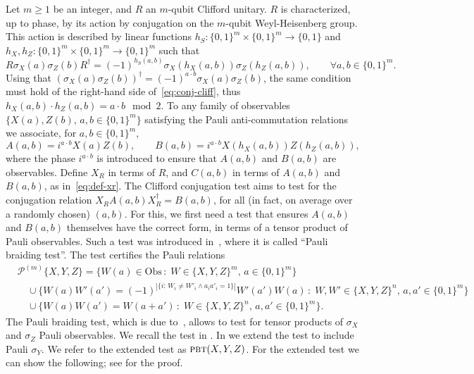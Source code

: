 \documentclass{toc}
\newcommand{\setft}[1]{\mathrm{#1}}
\newcommand{\Obs}{\setft{Obs}}
\newcommand{\pbt}{\textsc{pbt}}
\newcommand{\paulin}{\mathcal{P}^{(m)}\!}
\begin{document}
Let $m\geq 1$ be an integer, and $R$ an $m$-qubit Clifford unitary. $R$ is characterized, up to phase, by its action by conjugation on the $m$-qubit Weyl-Heisenberg group. This action is described  by linear functions $h_S:\{0,1\}^m\times\{0,1\}^m \to \{0,1\}$ and $h_X,h_Z:\{0,1\}^m\times\{0,1\}^m \to \{0,1\}^m$ such that
\begin{equation}\label{eq:conj-cliff}
R \sigma_X(a)\sigma_Z(b) R^\dagger = (-1)^{h_S(a,b)}\sigma_X(h_X(a,b))\sigma_Z(h_Z(a,b)),\qquad\forall a,b\in\{0,1\}^m.
\end{equation}
Using that $(\sigma_X(a)\sigma_Z(b))^\dagger = (-1)^{a\cdot b} \sigma_X(a)\sigma_Z(b)$, the same condition must hold of the right-hand side of~\eqref{eq:conj-cliff}, thus $h_X(a,b)\cdot h_Z(a,b) = a\cdot b\mod 2$. 
 To any family of observables $\{X(a),Z(b),\,a,b\in\{0,1\}^m\}$ satisfying the Pauli anti-commutation relations we associate,  for $a,b\in\{0,1\}^m$,
\begin{equation}\label{eq:def-control-c}
A(a,b) = i^{a\cdot b}X(a)Z(b), \qquad B(a,b) = i^{a\cdot b}X(h_X(a,b))Z(h_Z(a,b)),
\end{equation}
where the phase $i^{a\cdot b}$ is introduced to ensure that $A(a,b)$ and $B(a,b)$ are observables. Define $X_R$ in terms of $R$, and $C(a,b)$ in terms of $A(a,b)$ and $B(a,b)$, as in~\eqref{eq:def-xr}. 
The Clifford conjugation test aims to test for the conjugation relation $X_RA(a,b)X_R^\dagger = B(a,b)$, for all (in fact, on average over a randomly chosen) $(a,b)$. For this, we first need a test that ensures $A(a,b)$ and $B(a,b)$ themselves have the correct form, in terms of a tensor product of Pauli observables. Such a test was introduced in~\cite{natarajan2016robust}, where it is called ``Pauli braiding test''. The test certifies the Pauli relations 
\begin{align*}
& {\paulin}\{X,Y,Z\} = \Big\{ W(a)\in\Obs\,:\;W \in \{X,Y,Z\}^m,\,a\in\{0,1\}^m\Big\} \\
&\quad\cup \Big\{W(a)W'(a')=(-1)^{|\{i:\,W_i\neq W'_i \wedge a_ia'_i=1\}|} W'(a')W(a)\,:\; W,W' \in \{X,Y,Z\}^n,\, a,a'\in\{0,1\}^m\Big\}\\
&\quad \cup\Big\{ W(a)W(a')=W(a+a')\,:\;W\in\{X,Y,Z\}^n,\, a,a'\in\{0,1\}^m\Big\}.
\end{align*}
The Pauli braiding test, which is due to~\cite{natarajan2016robust}, allows to test for tensor products of $\sigma_X$ and $\sigma_Z$ Pauli observables. We recall the test in . In  we extend the test to include Pauli $\sigma_Y$. We refer to the extended test as $\pbt(X,Y,Z)$. For the extended test we can show the following; see  for the proof.
\end{document}

